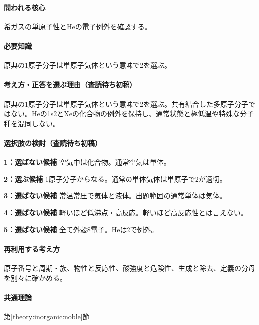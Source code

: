 \paragraph{問われる核心} 希ガスの単原子性とHeの電子例外を確認する。

\paragraph{必要知識} 原典の1原子分子は単原子気体という意味で2を選ぶ。

\paragraph{考え方・正答を選ぶ理由（査読待ち初稿）} 原典の1原子分子は単原子気体という意味で2を選ぶ。共有結合した多原子分子ではない。Heの1s2とXeの化合物の例外を保持し、通常状態と極低温や特殊な分子種を混同しない。

\paragraph{選択肢の検討（査読待ち初稿）}\mbox{}\par

\noindent\textbf{1：選ばない候補} 空気中は化合物。通常空気は単体。\par

\noindent\textbf{2：選ぶ候補} 1原子分子からなる。通常の単体気体は単原子で2が適切。\par

\noindent\textbf{3：選ばない候補} 常温常圧で気体と液体。出題範囲の通常単体は気体。\par

\noindent\textbf{4：選ばない候補} 軽いほど低沸点・高反応。軽いほど高反応性とは言えない。\par

\noindent\textbf{5：選ばない候補} 全て外殻8電子。Heは2で例外。\par

\paragraph{再利用する考え方} 原子番号と周期・族、物性と反応性、酸強度と危険性、生成と除去、定義の分母を別々に確かめる。

\paragraph{共通理論} \hyperref[theory:inorganic:noble]{第\ref*{theory:inorganic:noble}節}

